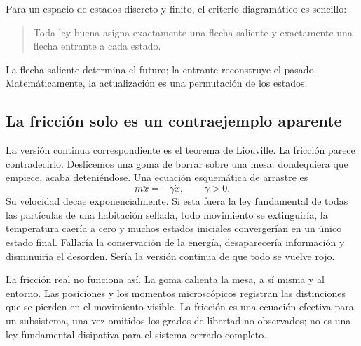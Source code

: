 Para un espacio de estados discreto y finito, el criterio diagramático es sencillo:
\begin{quote}
Toda ley buena asigna exactamente una flecha saliente y exactamente una flecha entrante a cada estado.
\end{quote}
La flecha saliente determina el futuro; la entrante reconstruye el pasado. Matemáticamente, la actualización es una permutación de los estados.

\subsection{La fricción solo es un contraejemplo aparente}

La versión continua correspondiente es el teorema de Liouville. La fricción parece contradecirlo. Deslicemos una goma de borrar sobre una mesa: dondequiera que empiece, acaba deteniéndose. Una ecuación esquemática de arrastre es
\begin{equation}
 m\ddot x=-\gamma\dot x,
 \qquad \gamma>0.
 \label{eq:sm1-drag}
\end{equation}
Su velocidad decae exponencialmente. Si esta fuera la ley fundamental de todas las partículas de una habitación sellada, todo movimiento se extinguiría, la temperatura caería a cero y muchos estados iniciales convergerían en un único estado final. Fallaría la conservación de la energía, desaparecería información y disminuiría el desorden. Sería la versión continua de que todo se vuelve rojo.

La fricción real no funciona así. La goma calienta la mesa, a sí misma y al entorno. Las posiciones y los momentos microscópicos registran las distinciones que se pierden en el movimiento visible. La fricción es una ecuación efectiva para un subsistema, una vez omitidos los grados de libertad no observados; no es una ley fundamental disipativa para el sistema cerrado completo.

\begin{classroomqa}
\end{classroomqa}

